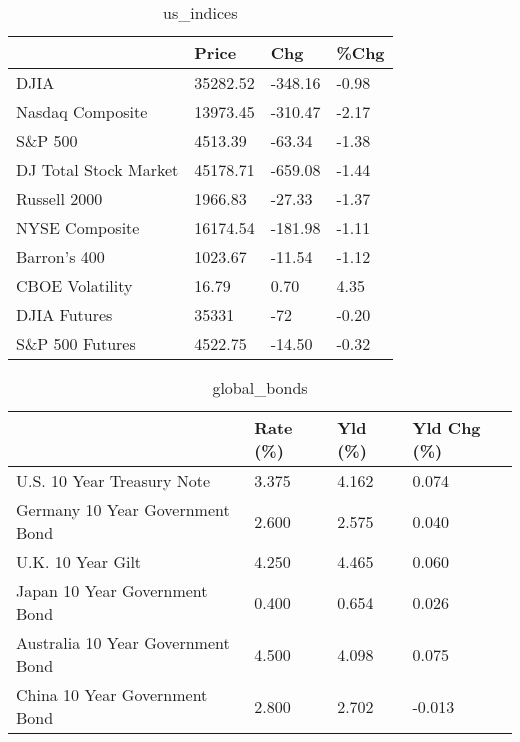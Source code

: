 \documentclass{article}%
\begin{document}
%


\begin{table}[htbp]%
\caption{us\_indices}%
\centering%
\begin{adjustbox}{width=1\textwidth}%
\begin{tabular}{llll}
\toprule
                      &    Price &     Chg &  \%Chg \\
\midrule
                 DJIA & 35282.52 & -348.16 & -0.98 \\
     Nasdaq Composite & 13973.45 & -310.47 & -2.17 \\
              S\&P 500 &  4513.39 &  -63.34 & -1.38 \\
DJ Total Stock Market & 45178.71 & -659.08 & -1.44 \\
         Russell 2000 &  1966.83 &  -27.33 & -1.37 \\
       NYSE Composite & 16174.54 & -181.98 & -1.11 \\
         Barron's 400 &  1023.67 &  -11.54 & -1.12 \\
      CBOE Volatility &    16.79 &    0.70 &  4.35 \\
         DJIA Futures &    35331 &     -72 & -0.20 \\
      S\&P 500 Futures &  4522.75 &  -14.50 & -0.32 \\
\bottomrule
\end{tabular}
%
\end{adjustbox}%
\end{table}

%


\begin{table}[htbp]%
\caption{global\_bonds}%
\centering%
\begin{adjustbox}{width=1\textwidth}%
\begin{tabular}{llll}
\toprule
                                  & Rate (\%) & Yld (\%) & Yld Chg (\%) \\
\midrule
       U.S. 10 Year Treasury Note &    3.375 &   4.162 &       0.074 \\
  Germany 10 Year Government Bond &    2.600 &   2.575 &       0.040 \\
                U.K. 10 Year Gilt &    4.250 &   4.465 &       0.060 \\
    Japan 10 Year Government Bond &    0.400 &   0.654 &       0.026 \\
Australia 10 Year Government Bond &    4.500 &   4.098 &       0.075 \\
    China 10 Year Government Bond &    2.800 &   2.702 &      -0.013 \\
\bottomrule
\end{tabular}
%
\end{adjustbox}%
\end{table}
\end{document}

